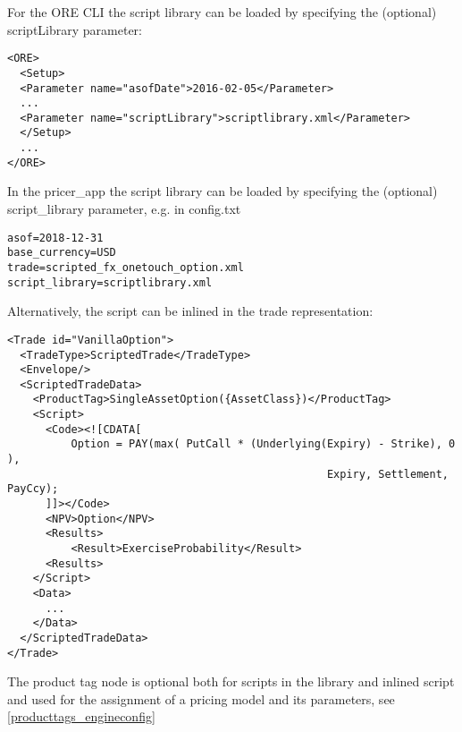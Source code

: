 \ifdefined\STModuleDoc

For the ORE CLI the script library can be loaded by specifying the (optional) scriptLibrary parameter:

\begin{verbatim}
<ORE>
  <Setup>
  <Parameter name="asofDate">2016-02-05</Parameter>
  ...
  <Parameter name="scriptLibrary">scriptlibrary.xml</Parameter>
  </Setup>
  ...
</ORE>
\end{verbatim}

In the pricer\_app the script library can be loaded by specifying the (optional) script\_library parameter, e.g. in config.txt

\begin{verbatim}
asof=2018-12-31
base_currency=USD
trade=scripted_fx_onetouch_option.xml
script_library=scriptlibrary.xml
\end{verbatim}

Alternatively, the script can be inlined in the trade representation:

\begin{verbatim}
<Trade id="VanillaOption">
  <TradeType>ScriptedTrade</TradeType>
  <Envelope/>
  <ScriptedTradeData>
    <ProductTag>SingleAssetOption({AssetClass})</ProductTag>
    <Script>
      <Code><![CDATA[
          Option = PAY(max( PutCall * (Underlying(Expiry) - Strike), 0 ),
                                                  Expiry, Settlement, PayCcy);
      ]]></Code>
      <NPV>Option</NPV>
      <Results>
          <Result>ExerciseProbability</Result>
      <Results>
    </Script>
    <Data>
      ...
    </Data>
  </ScriptedTradeData>
</Trade>
\end{verbatim}

The product tag node is optional both for scripts in the library and inlined script and used for the assignment of a
pricing model and its parameters, see \ref{producttags_engineconfig}

\fi